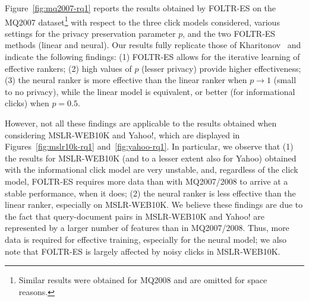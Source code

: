 Figure~\ref{fig:mq2007-rq1} reports the results obtained by FOLTR-ES on the MQ2007 dataset\footnote{Similar results were obtained for MQ2008 and are omitted for space reasons.} with respect to the three click models considered, various settings for the privacy preservation parameter $p$, and the two FOLTR-ES methods (linear and neural). Our results fully replicate those of Kharitonov~\cite{kharitonov2019federated} and indicate the following findings: (1) FOLTR-ES allows for the iterative learning of effective rankers; (2) high values of $p$ (lesser privacy) provide higher effectiveness; 
(3) the neural ranker is more effective than the linear ranker when $p \rightarrow 1$ (small to no privacy), while the linear model is equivalent, or better (for informational clicks) when $p=0.5$. 

However, not all these findings are applicable to the results obtained when considering MSLR-WEB10K and Yahoo!, which are displayed in Figures~\ref{fig:mslr10k-rq1} and~\ref{fig:yahoo-rq1}. In particular, we observe that (1) the results for MSLR-WEB10K (and to a lesser extent also for Yahoo) obtained with the informational click model are very unstable, and, regardless of the click model, FOLTR-ES requires more data than with MQ2007/2008 to arrive at a stable performance, when it does; (2) the neural ranker is less effective than the linear ranker, especially on MSLR-WEB10K. We believe these findings are due to the fact that query-document pairs in MSLR-WEB10K and Yahoo! are represented by a larger number of features than in MQ2007/2008. Thus, more data is required for effective training, especially for the neural model; we also note that FOLTR-ES is largely affected by noisy clicks in MSLR-WEB10K. 






